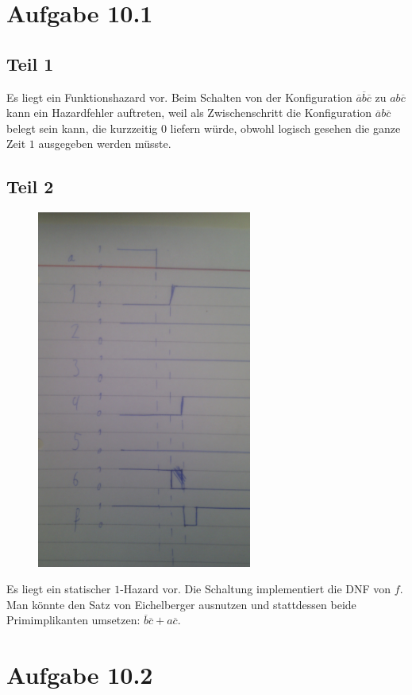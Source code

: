 \documentclass[10pt,a4paper]{article}
\begin{document}
\section*{Aufgabe 10.1}

\subsection*{Teil 1}

Es liegt ein Funktionshazard vor.
Beim Schalten von der Konfiguration $\overline{a}\overline{b}\overline{c}$ zu $ab\overline{c}$ kann ein Hazardfehler auftreten, weil als Zwischenschritt die Konfiguration $\overline{a}b\overline{c}$ belegt sein kann, die kurzzeitig $0$ liefern würde, obwohl logisch gesehen die ganze Zeit $1$ ausgegeben werden müsste.

\subsection*{Teil 2}

\begin{figure}[h!]
\includegraphics[width=200pt]{10_1_2}
\end{figure}
Es liegt ein statischer $1$-Hazard vor.
Die Schaltung implementiert die DNF von $f$.
Man könnte den Satz von Eichelberger ausnutzen und stattdessen beide Primimplikanten umsetzen: $\overline{b}\overline{c} + a\overline{c}$.

\section*{Aufgabe 10.2}
\end{document}
